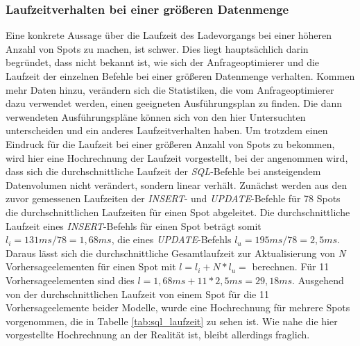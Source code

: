 
\subsubsection{Laufzeitverhalten bei einer größeren Datenmenge}
Eine konkrete Aussage über die Laufzeit des Ladevorgangs bei einer
höheren Anzahl von Spots zu machen, ist schwer. Dies liegt
hauptsächlich darin begründet, dass nicht bekannt ist, wie sich der
Anfrageoptimierer und die Laufzeit der einzelnen Befehle bei einer
größeren Datenmenge verhalten. Kommen mehr Daten hinzu, verändern sich
die Statistiken, die vom Anfrageoptimierer dazu verwendet werden,
einen geeigneten Ausführungsplan zu finden. Die dann verwendeten
Ausführungspläne können sich von den hier Untersuchten unterscheiden
und ein anderes Laufzeitverhalten haben. Um trotzdem einen Eindruck
für die Laufzeit bei einer größeren Anzahl von Spots zu bekommen, wird
hier eine Hochrechnung der Laufzeit vorgestellt, bei der angenommen
wird, dass sich die durchschnittliche Laufzeit der
\textit{SQL}-Befehle bei ansteigendem Datenvolumen nicht verändert,
sondern linear verhält. Zunächst werden aus den zuvor gemessenen
Laufzeiten der \textit{INSERT}- und \textit{UPDATE}-Befehle für 78
Spots die durchschnittlichen Laufzeiten für einen Spot abgeleitet. Die
durchschnittliche Laufzeit eines \textit{INSERT}-Befehls für einen
Spot beträgt somit $l_i = 131 ms / 78 = 1,68 ms$, die eines
\textit{UPDATE}-Befehls $l_u = 195 ms / 78 = 2,5 ms$. Daraus lässt
sich die durchschnittliche Gesamtlaufzeit zur Aktualisierung von
\textit{N} Vorhersageelementen für einen Spot mit $l = l_i + N * l_u =
$ berechnen. Für 11 Vorhersageelementen sind dies $l = 1,68 ms + 11 *
2,5 ms = 29,18 ms$. Ausgehend von der durchschnittlichen Laufzeit von
einem Spot für die 11 Vorhersageelemente beider Modelle, wurde eine
Hochrechnung für mehrere Spots vorgenommen, die in Tabelle
\ref{tab:sql_laufzeit} zu sehen ist. Wie nahe die hier vorgestellte
Hochrechnung an der Realität ist, bleibt allerdings fraglich.


